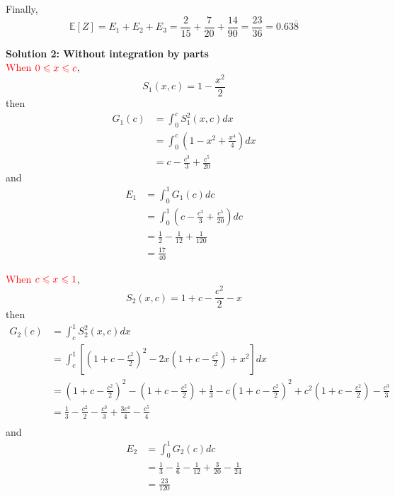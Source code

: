 \documentclass[12pt]{simple_doc}
\begin{document}
    Finally,
    \begin{equation*}
        \mathbb{E}[Z] = E_1 + E_2 + E_3 = \frac{2}{15} + \frac{7}{20} + \frac{14}{90}
                      = \frac{23}{36} = 0.63\overline{8}
    \end{equation*}


    \medskip
    \textbf{Solution 2: Without integration by parts}\\
    \textcolor{red}{When} $\color{red} 0 \leqslant x \leqslant c$,
    \begin{equation*}
        S_1(x, c) = 1 - \frac{x^2}{2}
    \end{equation*}
    then
    \begin{equation*}
		\begin{aligned}
		G_1(c) &= \int_0^c S_1^2(x, c) dx \\
		   &= \int_0^c (1 - x^2 + \frac{x^4}{4}) dx\\
           &= c - \frac{c^3}{3} + \frac{c^5}{20}
		\end{aligned}
	\end{equation*}
    and
    \begin{equation*}
		\begin{aligned}
		E_1 &= \int_0^1 G_1(c) dc \\
		   &= \int_0^1 ( c - \frac{c^3}{3} + \frac{c^5}{20}) dc\\
           &= \frac{1}{2} - \frac{1}{12} + \frac{1}{120}\\
           &= \frac{17}{40}
		\end{aligned}
	\end{equation*}

    \textcolor{red}{When} $\color{red} c \leqslant x \leqslant 1$,
    \begin{equation*}
        S_2(x, c) = 1 + c - \frac{c^2}{2} - x
    \end{equation*}
    then
    \begin{equation*}
		\begin{aligned}
		G_2(c) &= \int_c^1 S_2^2(x, c) dx \\
		   &= \int_c^1 [(1 + c - \frac{c^2}{2})^2 - 2x(1 + c - \frac{c^2}{2}) + x^2] dx\\
           &= (1 + c - \frac{c^2}{2})^2 - (1 + c - \frac{c^2}{2}) + \frac{1}{3}
             - c(1 + c - \frac{c^2}{2})^2 + c^2(1 + c - \frac{c^2}{2}) - \frac{c^3}{3}\\
           &= \frac{1}{3} - \frac{c^2}{2} - \frac{c^3}{3} + \frac{3c^4}{4} - \frac{c^5}{4}\\
		\end{aligned}
	\end{equation*}
    and
    \begin{equation*}
		\begin{aligned}
		E_2 &= \int_0^1 G_2(c) dc \\
		   &= \frac{1}{3} - \frac{1}{6} - \frac{1}{12} + \frac{3}{20} - \frac{1}{24}\\
           &= \frac{23}{120}
		\end{aligned}
	\end{equation*}
\end{document}
